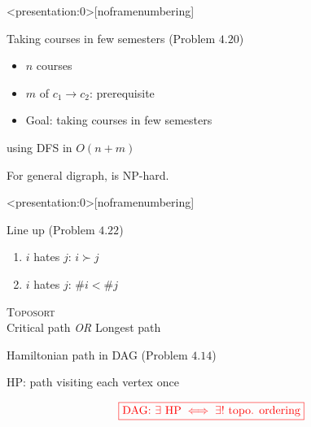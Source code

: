 \begin{frame}<presentation:0>[noframenumbering]
  \begin{exampleblock}{Taking courses in few semesters (Problem $4.20$)}
    \begin{itemize}
      \item $n$ courses
      \item $m$ of $c_1 \to c_2$: prerequisite
      \item Goal: taking courses in few semesters
    \end{itemize}
  \end{exampleblock}

  \pause
  \vspace{0.60cm}
  \centerline{ using DFS in $O(n + m)$}

  \pause
  \vspace{0.80cm}
  \centerline{For general digraph,  is NP-hard.}
\end{frame}

\begin{frame}<presentation:0>[noframenumbering]
  \begin{exampleblock}{Line up (Problem $4.22$)}
    \begin{enumerate}
      \item $i$ hates $j$: $i \succ j$
      \item $i$ hates $j$: $\# i < \# j$
    \end{enumerate}
  \end{exampleblock}

  \vspace{0.50cm}
  \begin{center}
    \textsc{Toposort} \\[8pt]

    Critical path \emph{OR} Longest path
  \end{center}
\end{frame}

\begin{frame}
  \begin{exampleblock}{Hamiltonian path in DAG (Problem $4.14$)}
    \begin{center}
      HP: path visiting each vertex once \\[8pt]

    \end{center}
  \end{exampleblock}

  \pause
  \vspace{0.60cm}
  \centerline{}

  \pause
  \vspace{0.50cm}

  \pause
  \[
    \textcolor{red}{\boxed{\text{DAG: } \exists \text{ HP} \iff \exists! \text{ topo. ordering}}}
  \]
\end{frame}

